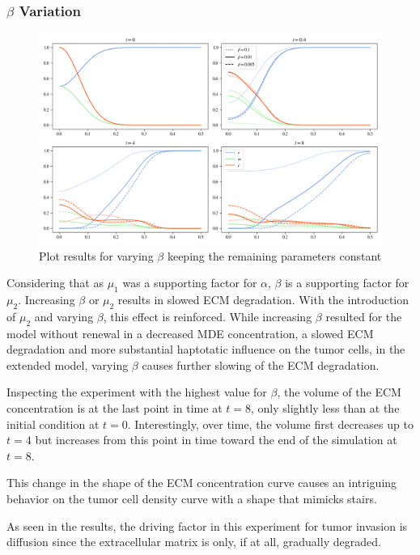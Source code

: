 \subsubsection*{$\beta$ Variation}
\begin{figure}[h!]
    \centering
    \includegraphics[width=\textwidth]{resources/images/prolif_beta_variation.png}
    \caption{Plot results for varying $\beta$ keeping the remaining parameters constant}
    \label{fig:prolif_beta_variation}
\end{figure}

Considering that as $\mu_1$ was a supporting factor for $\alpha$, $\beta$ is a supporting factor for $\mu_2$. Increasing $\beta$ or $\mu_2$ results in slowed ECM degradation. With the introduction of $\mu_2$ and varying $\beta$, this effect is reinforced. While increasing $\beta$ resulted for the model without renewal in a decreased MDE concentration, a slowed ECM degradation and more substantial haptotatic influence on the tumor cells, in the extended model, varying $\beta$ causes further slowing of the ECM degradation. 

Inspecting the experiment with the highest value for $\beta$, the volume of the ECM concentration is at the last point in time at $t=8$, only slightly less than at the initial condition at $t=0$. Interestingly, over time, the volume first decreases up to $t=4$ but increases from this point in time toward the end of the simulation at $t=8$.

This change in the shape of the ECM concentration curve causes an intriguing behavior on the tumor cell density curve with a shape that mimicks stairs.

As seen in the results, the driving factor in this experiment for tumor invasion is diffusion since the extracellular matrix is only, if at all, gradually degraded.


